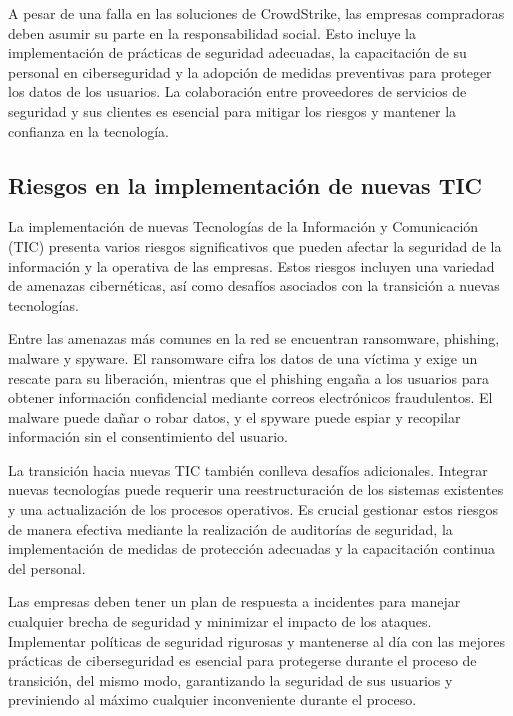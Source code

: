 \documentclass[letterpaper, 12pt]{report}
\begin{document}
A pesar de una falla en las soluciones de CrowdStrike, las empresas compradoras
deben asumir su parte en la responsabilidad social. Esto incluye la
implementación de prácticas de seguridad adecuadas, la capacitación de su
personal en ciberseguridad y la adopción de medidas preventivas para proteger
los datos de los usuarios. La colaboración entre proveedores de servicios de
seguridad y sus clientes es esencial para mitigar los riesgos y mantener la
confianza en la tecnología.

\subsection*{Riesgos en la implementación de nuevas TIC}

La implementación de nuevas Tecnologías de la Información y Comunicación (TIC)
presenta varios riesgos significativos que pueden afectar la seguridad de la
información y la operativa de las empresas. Estos riesgos incluyen una variedad
de amenazas cibernéticas, así como desafíos asociados con la transición a
nuevas tecnologías.

Entre las amenazas más comunes en la red se encuentran ransomware, phishing,
malware y spyware. El ransomware cifra los datos de una víctima y exige un
rescate para su liberación, mientras que el phishing engaña a los usuarios para
obtener información confidencial mediante correos electrónicos fraudulentos. El
malware puede dañar o robar datos, y el spyware puede espiar y recopilar
información sin el consentimiento del usuario.

La transición hacia nuevas TIC también conlleva desafíos adicionales. Integrar
nuevas tecnologías puede requerir una reestructuración de los sistemas
existentes y una actualización de los procesos operativos. Es crucial gestionar
estos riesgos de manera efectiva mediante la realización de auditorías de
seguridad, la implementación de medidas de protección adecuadas y la
capacitación continua del personal.

Las empresas deben tener un plan de respuesta a incidentes para manejar
cualquier brecha de seguridad y minimizar el impacto de los ataques.
Implementar políticas de seguridad rigurosas y mantenerse al día con las
mejores prácticas de ciberseguridad es esencial para protegerse durante el
proceso de transición, del mismo modo, garantizando la seguridad de sus
usuarios y previniendo al máximo cualquier inconveniente durante el proceso.

\nocite{*}

\printbibliography
\end{document}
